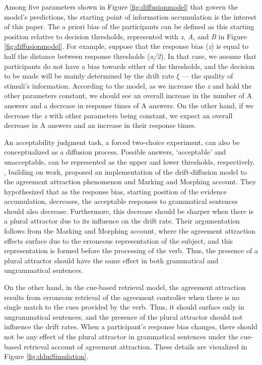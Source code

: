 Among five parameters shown in Figure \ref{fig:diffusionmodel} that govern the model's predictions, the starting point of information accumulation is the interest of this paper. The a priori bias of the participants can be defined as this starting position relative to decision thresholds, represented with \emph{z}, \emph{A}, and \emph{B} in Figure \ref{fig:diffusionmodel}. For example, suppose that the response bias (\emph{z}) is equal to half the distance between response thresholds (\emph{a/2}). In that case, we assume that participants do not have a bias towards either of the thresholds, and the decision to be made will be mainly determined by the drift rate \emph{$\xi$} --- the quality of stimuli's information. According to the model, as we increase the \emph{z} and hold the other parameters constant, we should see an overall increase in the number of A answers and a decrease in response times of A answers. On the other hand, if we decrease the \emph{z} with other parameters being constant, we expect an overall decrease in A answers and an increase in their response times.

An acceptability judgment task, a forced two-choice experiment, can also be conceptualized as a diffusion process. Possible answers, `acceptable' and unacceptable, can be represented as the upper and lower thresholds, respectively. , building on \cites{Staub2009} work, proposed an implementation of the drift-diffusion model to the agreement attraction phenomenon and Marking and Morphing account. They hypothesized that as the response bias, starting position of the evidence accumulation, decreases, the acceptable responses to grammatical sentences should also decrease. Furthermore, this decrease should be sharper when there is a plural attractor due to its influence on the drift rate. Their argumentation follows from the Marking and Morphing account, where the agreement attraction effects surface due to the erroneous representation of the subject, and this representation is formed before the processing of the verb. Thus, the presence of a plural attractor should have the same effect in both grammatical and ungrammatical sentences.

On the other hand, in the cue-based retrieval model, the agreement attraction results from erroneous retrieval of the agreement controller when there is no single match to the cues provided by the verb. Thus, it should surface only in ungrammatical sentences, and the presence of the plural attractor should not influence the drift rates. When a participant's response bias changes, there should not be any effect of the plural attractor in grammatical sentences under the cue-based retrieval account of agreement attraction. These details are visualized in Figure \ref{fig:ddmSimulation}. 


